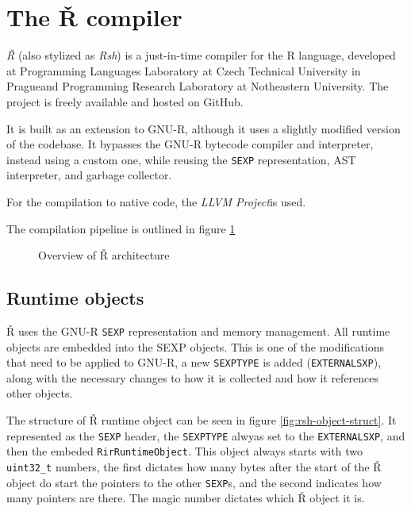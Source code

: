 \newpage
\section{The Ř compiler}

\textit{Ř} (also stylized as \textit{Rsh}) is a just-in-time compiler for the R language, developed at Programming Languages Laboratory at Czech Technical University in Prague\todocite and Programming Research Laboratory at Notheastern University\todocite. The project is freely available and hosted on GitHub.

It is built as an extension to GNU-R, although it uses a slightly modified version of the codebase. It bypasses the GNU-R bytecode compiler and interpreter, instead using a custom one, while reusing the \texttt{SEXP} representation, AST interpreter, and garbage collector.

For the compilation to native code, the \textit{LLVM Project}\todocite is used.

The compilation pipeline is outlined in figure \ref{fig:rsh-archit}

\begin{figure}
	\centering
	\caption{Overview of Ř architecture}\label{fig:rsh-archit}
\end{figure}

\subsection{Runtime objects}

Ř uses the GNU-R \texttt{SEXP} representation and memory management. All runtime objects are embedded into the SEXP objects. This is one of the modifications that need to be applied to GNU-R, a new \texttt{SEXPTYPE} is added (\texttt{EXTERNALSXP}), along with the necessary changes to how it is collected and how it references other objects.

The structure of Ř runtime object can be seen in figure \ref{fig:rsh-object-struct}. It represented as the \texttt{SEXP} header, the \texttt{SEXPTYPE} alwyas set to the \texttt{EXTERNALSXP}, and then the embeded \texttt{RirRuntimeObject}. This object always starts with two \texttt{uint32\_t} numbers, the first dictates how many bytes after the start of the Ř object do start the pointers to the other \texttt{SEXP}s, and the second indicates how many pointers are there. The magic number dictates which Ř object it is.


